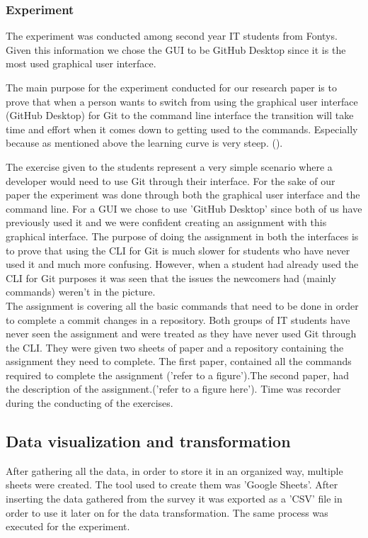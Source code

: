 \documentclass[]{report}
\begin{document}
	\subsubsection{Experiment}
	
	The experiment was conducted among second year IT students from Fontys. Given this information we chose the GUI to be GitHub Desktop since it is the most used graphical user interface.
	
	
	The main purpose for the experiment conducted for our research paper is to prove that when a person wants to switch from using the graphical user interface (GitHub Desktop) for Git to the command line interface the transition will take time and effort when it comes down to getting used to the commands. Especially because as mentioned above the learning curve is very steep. (\cite{justin_c_bagley_reasons_nodate}).

	The exercise given to the students represent a very simple scenario where a developer would need to use Git through their interface. For the sake of our paper the experiment was done through both the graphical user interface and the command line. For a GUI we chose to use 'GitHub Desktop' since both of us have previously used it and we were confident creating an assignment with this graphical interface. The purpose of doing the assignment in both the interfaces is to prove that using the CLI for Git is much slower for students who have never used it and much more confusing. However, when a student had already used the CLI for Git purposes it was seen that the issues the newcomers had (mainly commands) weren't in the picture.\\
	
	The assignment is covering all the basic commands that need to be done in order to complete a commit changes in a repository. Both groups of IT students have never seen the assignment and were treated as they have never used Git through the CLI. They were given two sheets of paper and a repository containing the assignment they need to complete. The first paper, contained all the commands required to complete the assignment ('refer to a figure').The second paper, had the description of the assignment.('refer to a figure here'). Time was recorder during the conducting of the exercises.
	
	
	\subsection{Data visualization and transformation}
	After gathering all the data, in order to store it in an organized way, multiple sheets were created. The tool used to create them was 'Google Sheets'. After inserting the data gathered from the survey it was exported as a 'CSV' file in order to use it later on for the data transformation. The same process was executed for the experiment. \\
	
\end{document}
